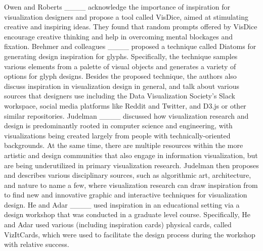 Owen and Roberts ____ acknowledge the importance of inspiration for visualization designers and propose a tool called VisDice, aimed at stimulating creative and inspiring ideas. They found that random prompts offered by VisDice encourage creative thinking and help in overcoming mental blockages and fixation. Brehmer and colleagues ____ proposed a technique called Diatoms for generating design inspiration for glyphs. Specifically, the technique samples various elements from a palette of visual objects and generates a variety of options for glyph designs. Besides the proposed technique, the authors also discuss inspiration in visualization design in general, and talk about various sources that designers use including the Data Visualization Society's Slack workspace, social media platforms like Reddit and Twitter, and D3.js or other similar repositories. Judelman ____ discussed how visualization research and design is predominantly rooted in computer science and engineering, with visualizations being created largely from people with technically-oriented backgrounds. At the same time, there are multiple resources within the more artistic and design communities that also engage in information visualization, but are being underutilized in primary visualization research. Judelman then proposes and describes various disciplinary sources, such as algorithmic art, architecture, and nature to name a few, where visualization research can draw inspiration from to find new and innovative graphic and interactive techniques for visualization design. He and Adar ____ used inspiration in an educational setting via a design workshop that was conducted in a graduate level course. Specifically, He and Adar used various (including inspiration cards) physical cards, called VizItCards, which were used to facilitate the design process during the workshop with relative success.


